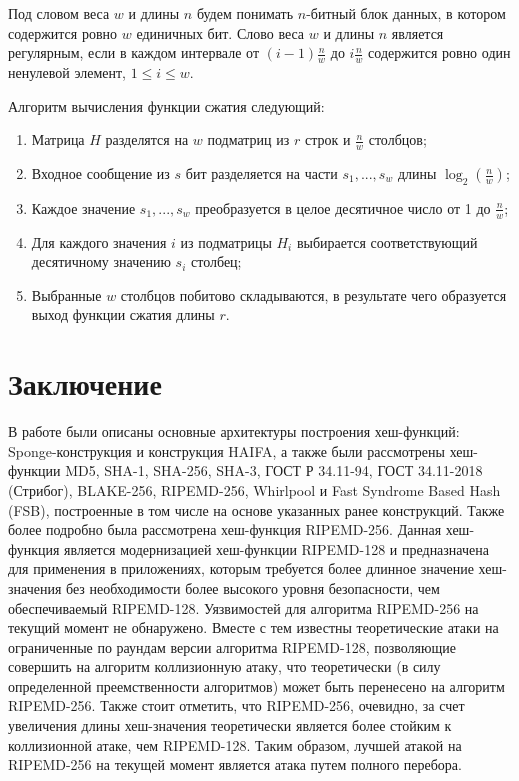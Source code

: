 \documentclass{./civarticle}
\begin{document}
Под словом веса $w$ и длины $n$ будем понимать $n$-битный блок данных, в котором содержится ровно $w$ единичных бит. Слово веса $w$ и длины $n$ является регулярным, если в каждом интервале от $(i-1)\frac{n}{w}$ до $i\frac{n}{w}$ содержится ровно один ненулевой элемент, $1 \leq i \leq w$.

Алгоритм вычисления функции сжатия следующий:

\begin{enumerate}
    \item Матрица $H$ разделятся на $w$ подматриц из $r$ строк и $\frac{n}{w}$ столбцов;
    \item Входное сообщение из $s$ бит разделяется на части $s_1, ..., s_w$ длины $\log_2(\frac{n}{w})$;
    \item Каждое значение $s_1, ..., s_w$ преобразуется в целое десятичное число от 1 до $\frac{n}{w}$;
    \item Для каждого значения $i$ из подматрицы $H_i$ выбирается соответствующий десятичному значению $s_i$ столбец;
    \item Выбранные $w$ столбцов побитово складываются, в результате чего образуется выход функции сжатия длины $r$.
    
\end{enumerate}

\section{Заключение}

В работе были описаны основные архитектуры построения хеш-функций: Sponge-конструкция и конструкция HAIFA, а также были рассмотрены хеш-функции MD5, SHA-1, SHA-256, SHA-3, ГОСТ Р 34.11-94, ГОСТ 34.11-2018 (Стрибог), BLAKE-256, RIPEMD-256, Whirlpool и Fast Syndrome Based Hash (FSB), построенные в том числе на основе указанных ранее конструкций. Также более подробно была рассмотрена хеш-функция RIPEMD-256. Данная хеш-функция является модернизацией хеш-функции RIPEMD-128 и предназначена для применения в приложениях, которым требуется более длинное значение хеш-значения без необходимости более высокого уровня безопасности, чем обеспечиваемый RIPEMD-128. Уязвимостей для алгоритма RIPEMD-256 на текущий момент не обнаружено. Вместе с тем известны теоретические атаки на ограниченные по раундам версии алгоритма RIPEMD-128, позволяющие совершить на алгоритм коллизионную атаку, что теоретически (в силу определенной преемственности алгоритмов) может быть перенесено на алгоритм RIPEMD-256. Также стоит отметить, что RIPEMD-256, очевидно, за счет увеличения длины хеш-значения теоретически является более стойким к коллизионной атаке, чем RIPEMD-128. Таким образом, лучшей атакой на RIPEMD-256 на текущей момент является атака путем полного перебора.
\end{document}
